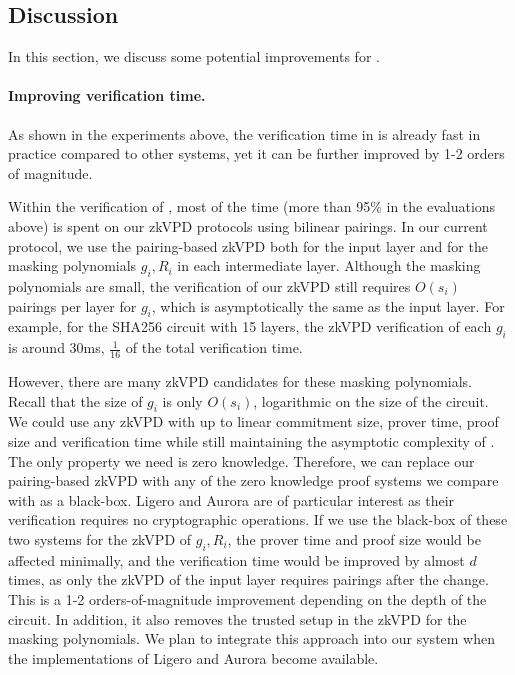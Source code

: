\subsection{Discussion}\label{subsec::discuss}

In this section, we discuss some potential improvements for \name.


\paragraph{Improving verification time.} As shown in the experiments above, the verification time in \name is already fast in practice compared to other systems, yet it can be further improved by 1-2 orders of magnitude. 

Within the verification of \name, most of the time (more than 95\% in the evaluations above) is spent on our zkVPD protocols using bilinear pairings. In our current protocol, we use the pairing-based zkVPD both for the input layer and for the masking polynomials $g_i, R_i$ in each intermediate layer. Although the masking polynomials are small, the verification of our zkVPD still requires $O(s_i)$ pairings per layer for $g_i$, which is asymptotically the same as the input layer. For example, for the SHA256 circuit with 15 layers, the zkVPD verification of each $g_i$ is around 30ms, $\frac{1}{16}$ of the total verification time.

However, there are many zkVPD candidates for these masking polynomials. Recall that the size of $g_i$ is only $O(s_i)$, logarithmic on the size of the circuit. We could use any zkVPD with up to linear commitment size, prover time, proof size and verification time while still maintaining the asymptotic complexity of \name. The only property we need is zero knowledge. Therefore, we can replace our pairing-based zkVPD with any of the zero knowledge proof systems we compare with as a black-box. Ligero and Aurora are of particular interest as their verification requires no cryptographic operations. If we use the black-box of these two systems for the zkVPD of $g_i, R_i$, the prover time and proof size would be affected minimally, and the verification time would be improved by almost $d$ times, as only the zkVPD of the input layer requires pairings after the change. This is a 1-2 orders-of-magnitude improvement depending on the depth of the circuit. In addition, it also removes the trusted setup in the zkVPD for the masking polynomials. We plan to integrate this approach into our system when the implementations of Ligero and Aurora become available.  


